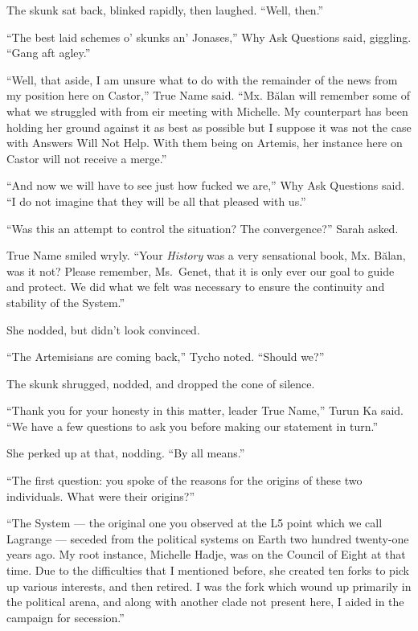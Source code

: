 The skunk sat back, blinked rapidly, then laughed. ``Well, then.''

``The best laid schemes o' skunks an' Jonases,'' Why Ask Questions said, giggling. ``Gang aft agley.''

``Well, that aside, I am unsure what to do with the remainder of the news from my position here on Castor,'' True Name said. ``Mx. Bălan will remember some of what we struggled with from eir meeting with Michelle. My counterpart has been holding her ground against it as best as possible but I suppose it was not the case with Answers Will Not Help. With them being on Artemis, her instance here on Castor will not receive a merge.''

``And now we will have to see just how fucked we are,'' Why Ask Questions said. ``I do not imagine that they will be all that pleased with us.''

``Was this an attempt to control the situation? The convergence?'' Sarah asked.

True Name smiled wryly. ``Your \emph{History} was a very sensational book, Mx. Bălan, was it not? Please remember, Ms.~Genet, that it is only ever our goal to guide and protect. We did what we felt was necessary to ensure the continuity and stability of the System.''

She nodded, but didn't look convinced.

``The Artemisians are coming back,'' Tycho noted. ``Should we?''

The skunk shrugged, nodded, and dropped the cone of silence.

``Thank you for your honesty in this matter, leader True Name,'' Turun Ka said. ``We have a few questions to ask you before making our statement in turn.''

She perked up at that, nodding. ``By all means.''

``The first question: you spoke of the reasons for the origins of these two individuals. What were their origins?''

``The System — the original one you observed at the L5 point which we call Lagrange — seceded from the political systems on Earth two hundred twenty-one years ago. My root instance, Michelle Hadje, was on the Council of Eight at that time. Due to the difficulties that I mentioned before, she created ten forks to pick up various interests, and then retired. I was the fork which wound up primarily in the political arena, and along with another clade not present here, I aided in the campaign for secession.''

